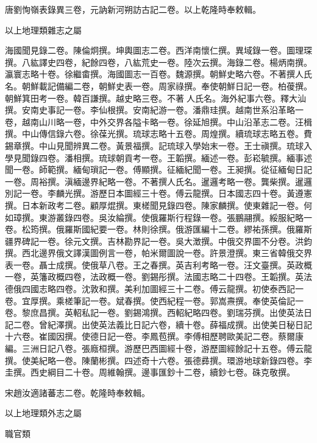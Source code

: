 \begin{pinyinscope}
唐劉恂嶺表錄異三卷，元訥新河朔訪古記二卷。以上乾隆時奉敕輯。

以上地理類雜志之屬

海國聞見錄二卷。陳倫炯撰。坤輿圖志二卷。西洋南懷仁撰。異域錄一卷。圖理琛撰。八紘譯史四卷，紀餘四卷，八紘荒史一卷。陸次云撰。海錄二卷。楊炳南撰。瀛寰志略十卷。徐繼畬撰。海國圖志一百卷。魏源撰。朝鮮史略六卷。不著撰人氏名。朝鮮載記備編二卷，朝鮮史表一卷。周家祿撰。奉使朝鮮日記一卷。柏葰撰。朝鮮箕田考一卷。韓百謙撰。越史略三卷。不著人氏名。海外紀事六卷。釋大汕撰。安南史事記一卷。李仙根撰。安南紀游一卷。潘鼎珪撰。越南世系沿革略一卷，越南山川略一卷，中外交界各隘卡略一卷。徐延旭撰。中山沿革志二卷。汪楫撰。中山傳信錄六卷。徐葆光撰。琉球志略十五卷。周煌撰。續琉球志略五卷。費錫章撰。中山見聞辨異二卷。黃景福撰。記琉球入學始末一卷。王士禛撰。琉球入學見聞錄四卷。潘相撰。琉球朝貢考一卷。王韜撰。緬述一卷。彭崧毓撰。緬事述聞一卷。師範撰。緬甸瑣記一卷。傅顯撰。征緬紀聞一卷。王昶撰。從征緬甸日記一卷。周裕撰。滇緬邊界紀略一卷。不著撰人氏名。暹邏考略一卷。龔柴撰。暹邏別記一卷。李麟光撰。游歷日本圖經三十卷。傅云龍撰。日本國志四十卷。黃遵憲撰。日本新政考二卷。顧厚焜撰。東槎聞見錄四卷。陳家麟撰。使東雜記一卷。何如璋撰。東游叢錄四卷。吳汝綸撰。使俄羅斯行程錄一卷。張鵬翮撰。綏服紀略一卷。松筠撰。俄羅斯國紀要一卷。林則徐撰。俄游匯編十二卷。繆祐孫撰。俄羅斯疆界碑記一卷。徐元文撰。吉林勘界記一卷。吳大澂撰。中俄交界圖不分卷。洪鈞撰。西北邊界俄文譯漢圖例言一卷，帕米爾圖說一卷。許景澄撰。東三省韓俄交界表一卷。聶士成撰。使俄草八卷。王之春撰。英吉利考略一卷。汪文臺撰。英政概一卷，英籓政概四卷，法政概一卷。劉錫彤撰。法國志略二十四卷。王韜撰。英法德俄四國志略四卷。沈敦和撰。美利加圖經三十二卷。傅云龍撰。初使泰西記一卷。宜厚撰。乘槎筆記一卷。斌春撰。使西紀程一卷。郭嵩燾撰。奉使英倫記一卷。黎庶昌撰。英軺私記一卷。劉錫鴻撰。西軺紀略四卷。劉瑞芬撰。出使英法日記二卷。曾紀澤撰。出使英法義比日記六卷，續十卷。薛福成撰。出使美日秘日記十六卷。崔國因撰。使德日記一卷。李鳳苞撰。李傅相歷聘歐美記二卷。蔡爾康編。三洲日記八卷。張廕桓撰。游歷巴西圖經十卷，游歷圖經餘記十五卷。傅云龍撰。使美紀略一卷。陳蘭彬撰。四述奇十六卷。張德彞撰。環游地球新錄四卷。李圭撰。西史綱目二十卷。周維翰撰。邊事匯鈔十二卷，續鈔七卷。硃克敬撰。

宋趙汝適諸蕃志二卷。乾隆時奉敕輯。

以上地理類外志之屬

職官類


\end{pinyinscope}
